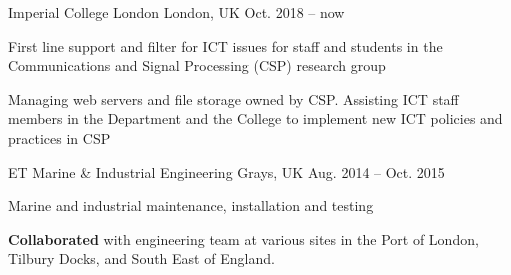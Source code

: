 

\begin{cventries}
            {Imperial College London} %
            {London, UK} %
            {Oct. 2018 -- now} %
            {
                \begin{cvitems} %
                    \item {First line support and filter for ICT issues for staff and students in the Communications and Signal Processing (CSP) research group}
                    \item {Managing web servers and file storage owned by CSP. Assisting ICT staff members in the Department and the College to implement new ICT policies and practices in CSP}
                \end{cvitems}
            }
            {ET Marine	\& Industrial Engineering} %
            {Grays, UK} %
            {Aug. 2014 -- Oct. 2015} %
            {
                \begin{cvitems} %
                    \item {Marine and industrial maintenance, installation and testing}
                    \item {\textbf{Collaborated} with engineering team at various sites in the Port of London, Tilbury Docks, and South East of England.}
                \end{cvitems}
            }
\end{cventries}
